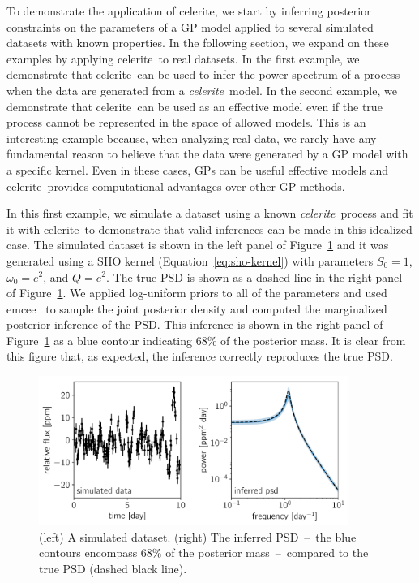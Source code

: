 \documentclass[manuscript, letterpaper]{aastex6}
\makeatletter
\let\origsubsection\subsection
\renewcommand\subsection{\@ifstar{\starsubsection}{\nostarsubsection}}
\newcommand\nostarsubsection[1]{\subsectionprelude\origsubsection{#1}}
\newcommand\starsubsection[1]{\subsectionprelude\origsubsection*{#1}}
\newcommand\subsectionprelude{\vspace{1em}}
\newcommand{\project}[1]{\textsf{#1}}
\newcommand{\celerite}{\project{celerite}}
\newcommand{\celeriteterm}{\emph{celerite}}
\newcommand{\emcee}{\project{emcee}}
\newcommand{\figureref}[1]{\ref{fig:#1}}
\newcommand{\Figure}[1]{Figure~\figureref{#1}}
\newcommand{\figurelabel}[1]{\label{fig:#1}}
\renewcommand{\eqref}[1]{\ref{eq:#1}}
\newcommand{\eqalt}[1]{Equation~\eqref{#1}}
\makeatother
\begin{document}
To demonstrate the application of \celerite, we start by inferring
posterior constraints on the parameters of a GP model applied to several
simulated datasets with known properties.
In the following section, we expand on these examples by applying
\celerite\ to real datasets.
In the first example, we demonstrate that \celerite\ can be used to infer
the power spectrum of a process when the data are generated from a
\celeriteterm\
model.
In the second example, we demonstrate that \celerite\ can be used as an
effective model even if the true process cannot be represented in the space of
allowed models.
This is an interesting example because, when analyzing real data, we rarely
have any fundamental reason to believe that the data were generated by a GP
model with a specific kernel.
Even in these cases, GPs can be useful effective models and \celerite\
provides computational advantages over other GP methods.

\subsection{Recovery of a celerite process}

In this first example, we simulate a dataset using a known \celeriteterm\
process and fit it with \celerite\ to demonstrate that valid inferences can be
made in this idealized case.
The simulated dataset is shown in the left panel of \Figure{simulated-correct}
and it was generated using a SHO kernel (\eqalt{sho-kernel}) with parameters
$S_0 = 1$, $\omega_0 = e^2$, and $Q = e^2$.
The true PSD is shown as a dashed line in the right panel of
\Figure{simulated-correct}.
We applied log-uniform priors to all of the parameters and used \emcee\
\citep{Foreman-Mackey:2013} to sample the joint posterior density and computed
the marginalized posterior inference of the PSD.
This inference is shown in the right panel of \Figure{simulated-correct} as a
blue contour indicating 68\% of the posterior mass.
It is clear from this figure that, as expected, the inference correctly
reproduces the true PSD.


\begin{figure}[!htbp]
\begin{center}
\includegraphics[width=0.9\textwidth]{figures/simulated/correct.pdf}
\caption{(left) A simulated dataset.
    (right) The inferred PSD~--~the blue contours encompass 68\% of the
    posterior mass~--~compared to the true PSD (dashed black line).
    \figurelabel{simulated-correct}}
\end{center}
\end{figure}
\end{document}
